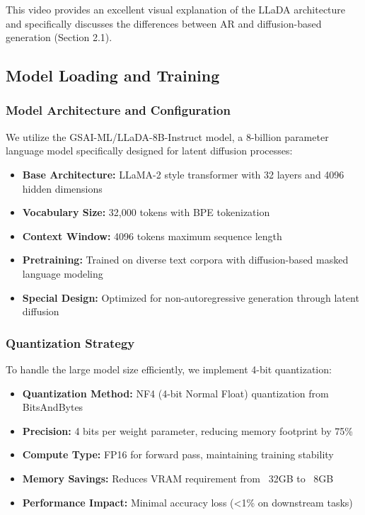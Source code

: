 \documentclass[a4paper,12pt]{article}
\begin{document}
This video provides an excellent visual explanation of the LLaDA architecture and specifically discusses the differences between AR and diffusion-based generation (Section 2.1).

\subsection{Model Loading and Training}

\subsubsection*{Model Architecture and Configuration}
We utilize the GSAI-ML/LLaDA-8B-Instruct model, a 8-billion parameter language model specifically designed for latent diffusion processes:

\begin{itemize}
    \item \textbf{Base Architecture:} LLaMA-2 style transformer with 32 layers and 4096 hidden dimensions
    \item \textbf{Vocabulary Size:} 32,000 tokens with BPE tokenization
    \item \textbf{Context Window:} 4096 tokens maximum sequence length
    \item \textbf{Pretraining:} Trained on diverse text corpora with diffusion-based masked language modeling
    \item \textbf{Special Design:} Optimized for non-autoregressive generation through latent diffusion
\end{itemize}

\subsubsection*{Quantization Strategy}
To handle the large model size efficiently, we implement 4-bit quantization:

\begin{itemize}
    \item \textbf{Quantization Method:} NF4 (4-bit Normal Float) quantization from BitsAndBytes
    \item \textbf{Precision:} 4 bits per weight parameter, reducing memory footprint by 75\%
    \item \textbf{Compute Type:} FP16 for forward pass, maintaining training stability
    \item \textbf{Memory Savings:} Reduces VRAM requirement from ~32GB to ~8GB
    \item \textbf{Performance Impact:} Minimal accuracy loss (<1\% on downstream tasks)
\end{itemize}
\end{document}
